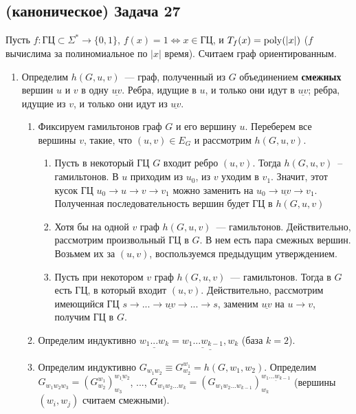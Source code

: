 \documentclass[a4paper]{article}
\def\poly{{\rm{poly}}}
\def\GC{{\mbox{ГЦ}}}
\begin{document}
\subsection*{(каноническое) Задача 27}
Пусть $f\colon \GC\subset\Sigma^*\to\{0,1\}$, $f(x)=1\Leftrightarrow x\in\GC$, и $T_f(x)=\poly(|x|)$ ($f$ вычислима за полиномиальное по $|x|$ время). Считаем граф ориентированным.
\begin{enumerate}
\item Определим $h(G,u,v)$~--- граф, полученный из $G$ объединением {\bf смежных} вершин $u$ и $v$ в одну $\underline{uv}$. Ребра, идущие в $u$, и только они идут в $\underline{uv}$; ребра, идущие из $v$, и только они идут из $\underline{uv}$.\begin{enumerate}
\item Фиксируем гамильтонов граф $G$ и его вершину $u$. Переберем все вершины $v$, такие, что $(u,v)\in E_G$ и рассмотрим $h(G,u,v)$.\begin{enumerate}
\item Пусть в некоторый ГЦ $G$ входит ребро $(u,v)$. Тогда $h(G,u,v)$~-- гамильтонов. В $u$ приходим из $u_0$, из $v$ уходим в $v_1$. Значит, этот кусок ГЦ $u_0\to u\to v\to v_1$ можно заменить на $u_0\to\underline{uv}\to v_1$. Полученная последовательность вершин будет ГЦ в $h(G,u,v)$
\item \label{l2} Хотя бы на одной $v$ граф $h(G,u,v)$~--- гамильтонов. Действительно, рассмотрим произвольный ГЦ в $G$. В нем есть пара смежных вершин. Возьмем их за $(u,v)$, воспользуемся предыдущим утверждением.
\item \label{l3} Пусть при некотором $v$ граф $h(G,u,v)$~--- гамильтонов. Тогда в $G$ есть ГЦ, в который входит $(u,v)$. Действительно, рассмотрим имеющийся ГЦ $s\to...\to \underline{uv}\to...\to s$, заменим $\underline{uv}$ на $u\to v$, получим ГЦ в $G$.
\end{enumerate}
\item Определим индуктивно $\underline{w_1...w_k}=\underline{\underline{w_1...w_{k-1}},w_k}$ (база $k=2$).
\item Определим индуктивно $G_{w_1w_2}\equiv G^{w_1}_{w_2}=h(G,w_1,w_2)$.\newline
Определим $G_{w_1w_2w_3}=(G^{w_1}_{w_2})^{\underline{w_1w_2}}_{w_3}$, ..., $G_{w_1w_2...w_k}=(G_{w_1w_2...w_{k-1}})^{\underline{w_1...w_{k-1}}}_{w_k}$ (вершины $(w_i,w_j)$ считаем смежными).

\end{enumerate}
\end{enumerate}
\end{document}
